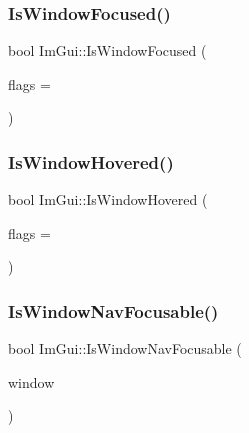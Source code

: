 \subsubsection{\texorpdfstring{Is\+Window\+Focused()}{IsWindowFocused()}}
{\footnotesize\ttfamily bool Im\+Gui\+::\+Is\+Window\+Focused (\begin{DoxyParamCaption}\item[{Im\+Gui\+Focused\+Flags}]{flags = {} }\end{DoxyParamCaption})}

\mbox{\label{namespaceImGui_aaed1ebf40cc2cb2ec30b0ba39b91d4a5}} 
\subsubsection{\texorpdfstring{Is\+Window\+Hovered()}{IsWindowHovered()}}
{\footnotesize\ttfamily bool Im\+Gui\+::\+Is\+Window\+Hovered (\begin{DoxyParamCaption}\item[{Im\+Gui\+Hovered\+Flags}]{flags = {} }\end{DoxyParamCaption})}

\mbox{\label{namespaceImGui_a6dfaa7187edcbc862be2edb2bbc987bb}} 
\subsubsection{\texorpdfstring{Is\+Window\+Nav\+Focusable()}{IsWindowNavFocusable()}}
{\footnotesize\ttfamily bool Im\+Gui\+::\+Is\+Window\+Nav\+Focusable (\begin{DoxyParamCaption}\item[{\hyperlink{structImGuiWindow}{Im\+Gui\+Window} $\ast$}]{window }\end{DoxyParamCaption})}

\mbox{\label{namespaceImGui_a48de6990762aa67d7da5c3264b92d44f}} 
